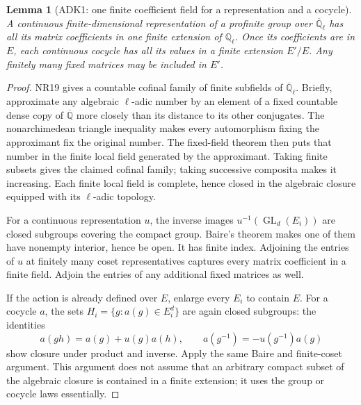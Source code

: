 \documentclass[11pt,a4paper]{article}
\numberwithin{equation}{section}
\newtheorem{lemma}[theorem]{Lemma}
\theoremstyle{remark}\newtheorem{remark}[theorem]{Remark}
\begin{document}
\begin{lemma}[ADK1: one finite coefficient field for a representation and a cocycle]
\label{claim:ADK1}
A continuous finite-dimensional representation of a profinite group
over $\overline{\mathbb Q}_\ell$ has all its matrix coefficients in
one finite extension of $\mathbb Q_\ell$.  Once its coefficients are
in $E$, each continuous cocycle has all its values in a finite
extension $E'/E$.  Any finitely many fixed matrices may be included
in $E'$.
\end{lemma}
\begin{proof}
NR19 gives a countable cofinal family of finite subfields of
$\overline{\mathbb Q}_\ell$.  Briefly, approximate any algebraic
$\ell$-adic number by an element of a fixed countable dense copy of
$\overline{\mathbb Q}$ more closely than its distance to its other
conjugates.  The nonarchimedean triangle inequality makes every
automorphism fixing the approximant fix the original number.  The
fixed-field theorem then puts that number in the finite local field
generated by the approximant.  Taking finite subsets gives the claimed
cofinal family; taking successive composita makes it increasing.
Each finite local field is complete, hence closed in the algebraic
closure equipped with its $\ell$-adic topology.

For a continuous representation $u$, the inverse images
$u^{-1}(\operatorname{GL}_d(E_i))$ are closed subgroups covering the
compact group.  Baire's theorem makes one of them have nonempty
interior, hence be open.  It has finite index.  Adjoining the entries
of $u$ at finitely many coset representatives captures every matrix
coefficient in a finite field.  Adjoin the entries of any additional
fixed matrices as well.

If the action is already defined over $E$, enlarge every $E_i$ to
contain $E$.  For a cocycle $a$, the sets
$H_i=\{g:a(g)\in E_i^d\}$ are again closed subgroups: the identities
\[
 a(gh)=a(g)+u(g)a(h),\qquad
 a(g^{-1})=-u(g^{-1})a(g)
\]
show closure under product and inverse.  Apply the same Baire and
finite-coset argument.  This argument does not assume that an arbitrary
compact subset of the algebraic closure is contained in a finite
extension; it uses the group or cocycle laws essentially.
\end{proof}
\end{document}
